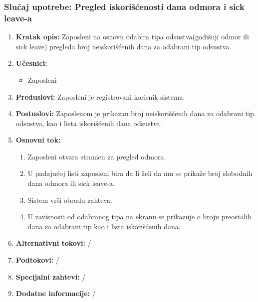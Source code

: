 \documentclass[a4paper]{article}
\begin{document}
\subsubsection{Slučaj upotrebe: Pregled iskorišćenosti dana odmora i sick leave-a}
\begin{enumerate}
    \item \textbf{Kratak opis:} Zaposleni na osnovu odabira tipa odsustva(godišnji odmor ili sick leave) pregleda broj neiskorišćenih dana za odabrani tip odsustva.
    \item \textbf{Učesnici:}
        \begin{itemize}
            \item Zaposleni
        \end{itemize}
    \item \textbf{Preduslovi:} Zaposleni je registrovani korisnik sistema.
    \item \textbf{Postuslovi:} Zaposlenom je prikazan broj neiskorišćenih dana za odabrani tip odsustva, kao i lista iskorišćenih dana odsustva.
    \item \textbf{Osnovni tok:}
        \begin{enumerate}
            \item Zaposleni otvara stranicu za pregled odmora.
            \item U padajućoj listi zaposleni bira da li želi da mu se prikaže broj slobodnih dana odmora ili sick leave-a.
            \item Sistem vrši obradu zahteva.
            \item U zavisnosti od odabranog tipa na ekranu se prikazuje o broju preostalih dana za odabrani tip kao i lista iskorišćenih dana.
        \end{enumerate}
    \item \textbf{Alternativni tokovi:} /
    \item \textbf{Podtokovi:} /
    \item \textbf{Specijalni zahtevi:} /
    \item \textbf{Dodatne informacije:} /
\end{enumerate}
\end{document}
